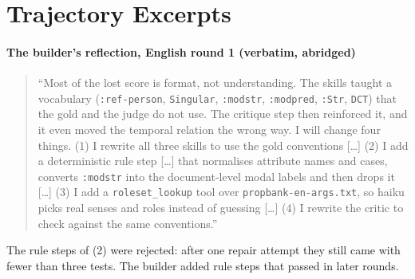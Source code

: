 \begin{table}[h]
\centering\scriptsize
\setlength{\tabcolsep}{3pt}

\caption{umrjudge checks on the English test documents.}
\label{tab:judgeen}
\end{table}

\begin{table}[h]
\centering\scriptsize
\setlength{\tabcolsep}{3pt}

\caption{timemljudge checks on the TimeML test documents (platinum-trained trajectory).}
\label{tab:judgetml}
\end{table}

\section{Trajectory Excerpts}
\label{app:case}

\paragraph{The builder's reflection, English round 1 (verbatim, abridged)}
\begin{quote}\small
``Most of the lost score is format, not understanding. The skills taught a vocabulary (\texttt{:ref-person}, \texttt{Singular}, \texttt{:modstr}, \texttt{:modpred}, \texttt{:Str}, \texttt{DCT}) that the gold and the judge do not use. The critique step then reinforced it, and it even moved the temporal relation the wrong way. I will change four things. (1) I rewrite all three skills to use the gold conventions [\ldots] (2) I add a deterministic rule step [\ldots] that normalises attribute names and cases, converts \texttt{:modstr} into the document-level modal labels and then drops it [\ldots] (3) I add a \texttt{roleset\_lookup} tool over \texttt{propbank-en-args.txt}, so haiku picks real senses and roles instead of guessing [\ldots] (4) I rewrite the critic to check against the same conventions.''
\end{quote}
The rule steps of (2) were rejected: after one repair attempt they still came with fewer than three tests. The builder added rule steps that passed in later rounds.

